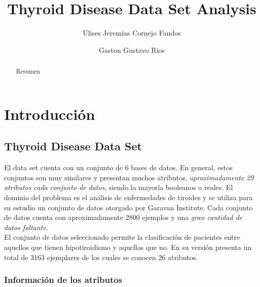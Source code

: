 \documentclass[osajnl,twocolumn,showpacs,superscriptaddress,10pt,floatfix]{revtex4-1} %
\begin{document}
\title{Thyroid Disease Data Set Analysis}

\author{Ulises Jeremias Cornejo Fandos}

\author{Gaston Gustavo Rios}


\begin{abstract}
Resumen
\end{abstract}

\maketitle %

\section{Introducción}

\subsection{Thyroid Disease Data Set }

El data set cuenta con un conjunto de 6 bases de datos. En general, estos conjuntos son muy similares y presentan muchos atributos, \textit{aproximadamente 29 atributos cada conjunto de datos}, siendo la mayoría booleanos o reales. El dominio del problema es el análisis de enfermedades de tiroides y se utiliza para su estudio un conjunto de datos otorgado por Garavan Institute. Cada conjunto de datos cuenta con aproximadamente 2800 ejemplos y una \textit{gran cantidad de datos faltante}. \\

El conjunto de datos seleccionado permite la clasificación de pacientes entre aquellos que tienen hipotiroidismo y aquellos que no. En su versión presenta un total de 3163 ejemplares de los cuales se conocen 26 atributos. \\

\subsubsection{Información de los atributos}
\end{document}
